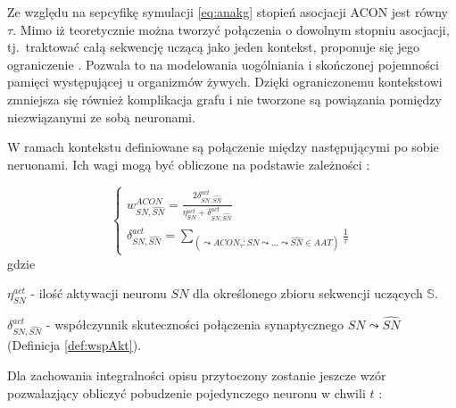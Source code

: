 Ze względu na sepcyfikę symulacji \ref{eq:anakg} stopień asocjacji ACON jest równy $\tau$. Mimo iż teoretycznie można tworzyć połączenia o dowolnym stopniu asocjacji, tj.~traktować
całą sekwencję uczącą jako jeden kontekst, proponuje się jego ograniczenie \cite{Horzyk}. Pozwala to na modelowania uogólniania i skończonej pojemności pamięci występującej
u organizmów żywych. Dzięki ograniczonemu kontekstowi zmniejsza się również komplikacja grafu i nie tworzone są powiązania pomiędzy niezwiązanymi ze sobą neuronami.

W ramach kontekstu definiowane są połączenie między następującymi po sobie neruonami. Ich wagi mogą być obliczone na podstawie zależności \cite[s. 226]{Horzyk}:

\begin{equation}
\begin{cases}
w_{SN, \widehat{SN}}^{ACON} = \frac{2 \delta_{SN, \widehat{SN}}^{act}}{\eta_{SN}^{act} + \delta_{SN, \widehat{SN}}^{act}}\\
\delta_{SN, \widehat{SN}}^{act} = \sum\limits_{(\leadsto ACON_{\tau}:SN \leadsto \dots \leadsto \widehat{SN} \in AAT)} \frac{1}{\tau}
\end{cases}
\end{equation}
gdzie 
\begin{description}
    \item $\eta_{SN}^{act}$ - ilość aktywacji neuronu $SN$ dla określonego zbioru sekwencji uczących $\mathbb{S}$.
    \item $\delta_{SN, \widehat{SN}}^{act}$ - współczynnik skuteczności połączenia synaptycznego $SN \leadsto \widehat{SN}$ (Definicja \ref{def:wspAkt}).
\end{description}

Dla zachowania integralności opisu przytoczony zostanie jeszcze wzór pozwalazjący obliczyć pobudzenie pojedynczego neuronu w chwili $t$ \cite[s. 227]{Horzyk}:

